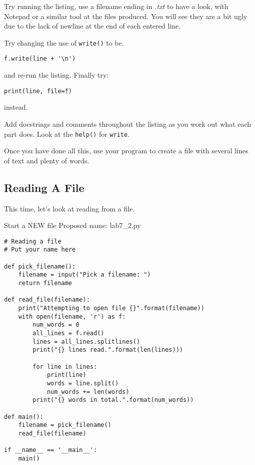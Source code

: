 \documentclass[12pt,oneside]{cttutorial}
\begin{document}
Try running the listing, use a filename ending in \emph{.txt} to have a look, with Notepad or a similar tool at the files produced. You will see they are a bit ugly due to the lack of newline at the end of each entered line.

Try changing the use of \lstinline!write()! to be.

\begin{lstlisting}
f.write(line + '\n')
\end{lstlisting}

and re-run the listing. Finally try:

\begin{lstlisting}
print(line, file=f)
\end{lstlisting}

instead.

Add docstrings and comments throughout the listing as you work out what each part does. Look at the \lstinline!help()! for \lstinline!write!.


Once you have done all this, use your program to create a file with several lines of text and plenty of words.

\subsection{Reading A File}

This time, let's look at reading from a file.

\alert{Start a NEW file}
Proposed name: lab7\_2.py
\begin{lstlisting}
# Reading a file
# Put your name here

def pick_filename():
    filename = input("Pick a filename: ")
    return filename

def read_file(filename):
    print("Attempting to open file {}".format(filename))
    with open(filename, 'r') as f:
        num_words = 0
        all_lines = f.read()
        lines = all_lines.splitlines()
        print("{} lines read.".format(len(lines)))
        
        for line in lines:
            print(line)
            words = line.split()
            num_words += len(words)
        print("{} words in total.".format(num_words))
            
def main():
    filename = pick_filename()
    read_file(filename)

if __name__ == '__main__':
    main()

\end{lstlisting}
\end{document}
